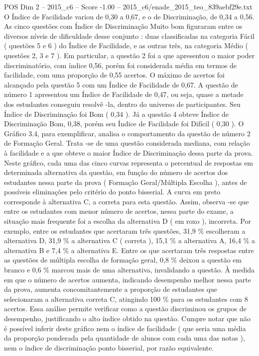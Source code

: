 \begin{textsample}{POS Dim 2 – 2015\_c6 – Score -1.00 – 2015\_c6/enade\_2015\_teo\_839aebf29e.txt}
O Índice de Facilidade variou de 0,30 a 0,67, e o de Discriminação, de 0,34 a 0,56.
As cinco questões com Índice de Discriminação Muito bom figuraram entre os diversos níveis de dificuldade desse conjunto : duas classificadas na categoria Fácil ( questões 5 e 6 ) do Índice de Facilidade, e as outras três, na categoria Médio ( questões 2, 3 e 7 ).
Em particular, a questão 2 foi a que apresentou o maior poder discriminatório, com índice 0,56, porém foi considerada média em termos de facilidade, com uma proporção de 0,55 acertos.
O máximo de acertos foi alcançado pela questão 5 com um Índice de Facilidade de 0,67.
A questão de número 1 apresentou um Índice de Facilidade de 0,47, ou seja, quase a metade dos estudantes conseguiu resolvê -la, dentro do universo de participantes.
Seu Índice de Discriminação foi Bom ( 0,34 ).
Já a questão 4 obteve Índice de Discriminação Bom, 0,38, porém seu Índice de Facilidade foi Difícil ( 0,30 ).
O Gráfico 3.4, para exemplificar, analisa o comportamento da questão de número 2 de Formação Geral.
Trata -se de uma questão considerada mediana, com relação à facilidade e a que obteve o maior Índice de Discriminação dessa parte da prova.
Neste gráfico, cada uma das cinco curvas representa o percentual de respostas em determinada alternativa da questão, em função do número de acertos dos estudantes nessa parte da prova ( Formação Geral/Múltipla Escolha ), antes de possíveis eliminações pelo critério do ponto bisserial.
A curva em preto corresponde à alternativa C, a correta para esta questão.
Assim, observa -se que entre os estudantes com menor número de acertos, nessa parte do exame, a situação mais frequente foi a escolha da alternativa D ( em roxo ), incorreta.
Por exemplo, entre os estudantes que acertaram três questões, 31,9 \% escolheram a alternativa D, 31,9 \% a alternativa C ( correta ), 15,1 \% a alternativa A, 16,4 \% a alternativa B e 7,4 \% a alternativa E.
Entre os que acertaram três respostas entre as questões de múltipla escolha de formação geral, 0,8 \% deixou a questão em branco e 0,6 \% marcou mais de uma alternativa, invalidando a questão.
À medida em que o número de acertos aumenta, indicando desempenho melhor nessa parte da prova, aumenta concomitantemente a proporção de estudantes que selecionaram a alternativa correta C, atingindo 100 \% para os estudantes com 8 acertos.
Essa análise permite verificar como a questão discriminou os grupos de desempenho, justificando o alto índice obtido na questão.
Cumpre notar que não é possível inferir deste gráfico nem o índice de facilidade ( que seria uma média da proporção ponderada pela quantidade de alunos com cada uma das notas ), nem o índice de discriminação ponto bisserial, por razão equivalente.

\end{textsample}
